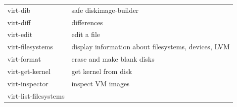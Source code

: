 \documentclass[
  14pt,
  english,
  a4paper,
]{scrreprt}
\begin{document}
\begin{longtable}[]{@{}ll@{}}
\begin{minipage}[t]{0.33\columnwidth}
virt-dib\strut
\end{minipage} & \begin{minipage}[t]{0.61\columnwidth}\raggedright
safe diskimage-builder\strut
\end{minipage}\tabularnewline
\begin{minipage}[t]{0.33\columnwidth}\raggedright
virt-diff\strut
\end{minipage} & \begin{minipage}[t]{0.61\columnwidth}\raggedright
differences\strut
\end{minipage}\tabularnewline
\begin{minipage}[t]{0.33\columnwidth}\raggedright
virt-edit\strut
\end{minipage} & \begin{minipage}[t]{0.61\columnwidth}\raggedright
edit a file\strut
\end{minipage}\tabularnewline
\begin{minipage}[t]{0.33\columnwidth}\raggedright
virt-filesystems\strut
\end{minipage} & \begin{minipage}[t]{0.61\columnwidth}\raggedright
display information about filesystems, devices, LVM\strut
\end{minipage}\tabularnewline
\begin{minipage}[t]{0.33\columnwidth}\raggedright
virt-format\strut
\end{minipage} & \begin{minipage}[t]{0.61\columnwidth}\raggedright
erase and make blank disks\strut
\end{minipage}\tabularnewline
\begin{minipage}[t]{0.33\columnwidth}\raggedright
virt-get-kernel\strut
\end{minipage} & \begin{minipage}[t]{0.61\columnwidth}\raggedright
get kernel from disk\strut
\end{minipage}\tabularnewline
\begin{minipage}[t]{0.33\columnwidth}\raggedright
virt-inspector\strut
\end{minipage} & \begin{minipage}[t]{0.61\columnwidth}\raggedright
inspect VM images\strut
\end{minipage}\tabularnewline
\begin{minipage}[t]{0.33\columnwidth}\raggedright
virt-list-filesystems\strut
\end{minipage} & \begin{minipage}[t]{0.61\columnwidth}\raggedright

\end{minipage}
\end{longtable}
\end{document}
